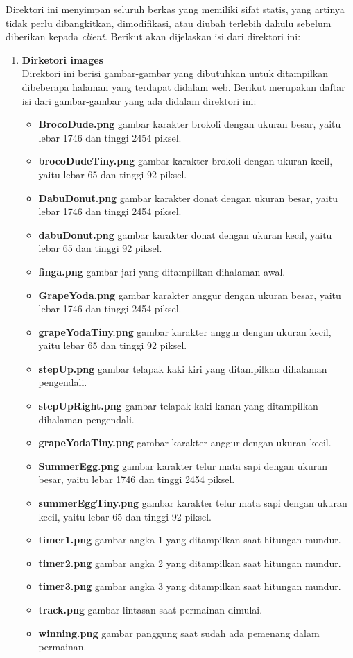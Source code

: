 \begin{enumerate}
	Direktori ini menyimpan seluruh berkas yang memiliki sifat statis, yang artinya tidak perlu dibangkitkan, dimodifikasi, atau diubah terlebih dahulu sebelum diberikan kepada \textit{client}. Berikut akan dijelaskan isi dari direktori ini:
	\begin{enumerate}
		\item \textbf{Dirketori images} \\
		Direktori ini berisi gambar-gambar yang dibutuhkan untuk ditampilkan dibeberapa halaman yang terdapat didalam web. Berikut merupakan daftar isi dari gambar-gambar yang ada didalam direktori ini: 
		\begin{itemize}
			\item \textbf{BrocoDude.png} gambar karakter brokoli dengan ukuran besar, yaitu lebar 1746 dan tinggi 2454 piksel.
			\item \textbf{brocoDudeTiny.png} gambar karakter brokoli dengan ukuran kecil, yaitu lebar 65 dan tinggi 92 piksel.
			\item \textbf{DabuDonut.png} gambar karakter donat dengan ukuran besar, yaitu lebar 1746 dan tinggi 2454 piksel.
			\item \textbf{dabuDonut.png} gambar karakter donat dengan ukuran kecil, yaitu lebar 65 dan tinggi 92 piksel.
			\item \textbf{finga.png} gambar jari yang ditampilkan dihalaman awal.
			\item \textbf{GrapeYoda.png} gambar karakter anggur dengan ukuran besar, yaitu lebar 1746 dan tinggi 2454 piksel.
			\item \textbf{grapeYodaTiny.png} gambar karakter anggur dengan ukuran kecil, yaitu lebar 65 dan tinggi 92 piksel.
			\item \textbf{stepUp.png} gambar telapak kaki kiri yang ditampilkan dihalaman pengendali.
			\item \textbf{stepUpRight.png} gambar telapak kaki kanan yang ditampilkan dihalaman pengendali.
			\item \textbf{grapeYodaTiny.png} gambar karakter anggur dengan ukuran kecil.
			\item \textbf{SummerEgg.png} gambar karakter telur mata sapi dengan ukuran besar, yaitu lebar 1746 dan tinggi 2454 piksel.
			\item \textbf{summerEggTiny.png} gambar karakter telur mata sapi dengan ukuran kecil, yaitu lebar 65 dan tinggi 92 piksel.
			\item \textbf{timer1.png} gambar angka 1 yang ditampilkan saat hitungan mundur.
			\item \textbf{timer2.png} gambar angka 2 yang ditampilkan saat hitungan mundur.
			\item \textbf{timer3.png} gambar angka 3 yang ditampilkan saat hitungan mundur.
			\item \textbf{track.png} gambar lintasan saat permainan dimulai.
			\item \textbf{winning.png} gambar panggung saat sudah ada pemenang dalam permainan.
		\end{itemize}
	

\end{enumerate}
\end{enumerate}
